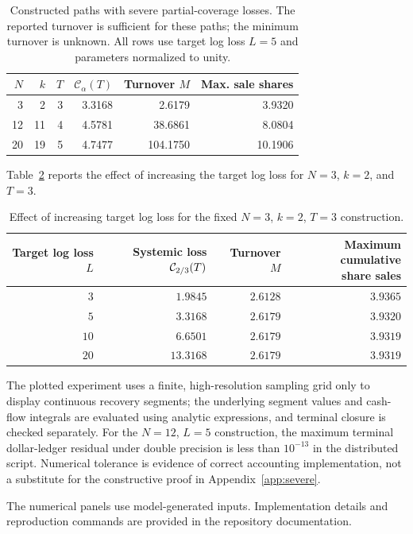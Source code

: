 \documentclass[review,hidelinks,onefignum,onetabnum]{siamonline250211}
\begin{document}
\begin{table}[H]\centering\small
\caption{Constructed paths with severe partial-coverage losses. The reported turnover is sufficient for these paths; the minimum turnover is unknown. All rows use target log loss $L=5$ and parameters normalized to unity.}\label{tab:witness}
\begin{tabular}{@{}rrrrrr@{}}\toprule
$N$ & $k$ & $T$ & $\mathcal C_\alpha(T)$ & Turnover $M$ & Max. sale shares \\\midrule
3 & 2 & 3 & 3.3168 & 2.6179 & 3.9320\\
12 & 11 & 4 & 4.5781 & 38.6861 & 8.0804\\
20 & 19 & 5 & 4.7477 & 104.1750 & 10.1906\\
\bottomrule\end{tabular}
\end{table}


Table~\ref{tab:target-loss} reports the effect of increasing the target log loss for $N=3$, $k=2$, and $T=3$.
\begin{table}[H]\centering\small
\caption{Effect of increasing target log loss for the fixed $N=3$, $k=2$, $T=3$ construction.}\label{tab:target-loss}
\begin{tabular}{@{}rrrr@{}}\toprule
Target log loss $L$ & Systemic loss $\mathcal{C}_{2/3}(T)$ & Turnover $M$ & \shortstack{Maximum cumulative\\share sales}\\\midrule
$3$ & $1.9845$ & $2.6128$ & $3.9365$\\
 $5$ & $3.3168$ & $2.6179$ & $3.9320$\\
$10$ & $6.6501$ & $2.6179$ & $3.9319$\\
$20$ & $13.3168$ & $2.6179$ & $3.9319$\\
\bottomrule\end{tabular}
\end{table}
The plotted experiment uses a finite, high-resolution sampling grid only to display continuous recovery segments; the underlying segment values and cash-flow integrals are evaluated using analytic expressions, and terminal closure is checked separately. For the $N=12$, $L=5$ construction, the maximum terminal dollar-ledger residual under double precision is less than $10^{-13}$ in the distributed script. Numerical tolerance is evidence of correct accounting implementation, not a substitute for the constructive proof in Appendix~\ref{app:severe}.

The numerical panels use model-generated inputs. Implementation details and reproduction commands are provided in the repository documentation.
\end{document}

